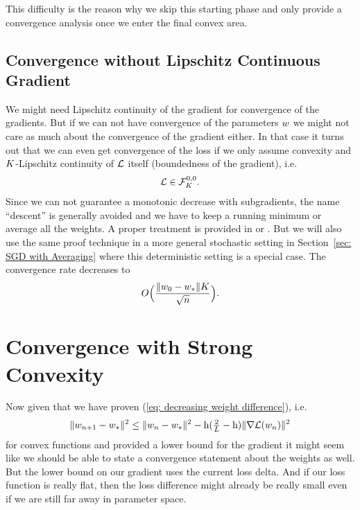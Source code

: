 This difficulty is the reason why we skip this starting phase and only
provide a convergence analysis once we enter the final convex area.

\subsection{Convergence without Lipschitz Continuous Gradient}\label{subsec: subgradient method}

We might need Lipschitz continuity of the gradient for convergence of the
gradients. But if we can not have convergence of the parameters \(\weights\) we
might not care as much about the convergence of the gradient either. In that
case it turns out that we can even get convergence of the loss if we only assume
convexity and \(\lipConst\)-Lipschitz continuity of \(\Loss\) itself
(boundedness of the gradient), i.e.
\begin{align*}
	\Loss \in \lipGradientSet[0,0]{\lipConst}.
\end{align*}
%
Since we can not guarantee a monotonic decrease with subgradients, the name
``descent'' is generally avoided and we have to keep a running minimum or
average all the weights. A proper treatment is provided in \textcite[Section
2.2.3]{nesterovLecturesConvexOptimization2018} or \textcite[Section
2.1]{bubeckConvexOptimizationAlgorithms2015}. But we will also use the same proof
technique in a more general stochastic setting in Section~\ref{sec: SGD with
Averaging} where this deterministic setting is a special case. The convergence
rate decreases to
\begin{align*}
	O\Big(\frac{\|\weights_0-\weights_*\|\lipConst}{\sqrt{n}}\Big).
\end{align*}

\section{Convergence with Strong Convexity}\label{sec: Strong Convexity}

Now given that we have proven (\ref{eq: decreasing weight difference}), i.e.
\begin{align}\label{eq: weight iteration}
	\|\weights_{n+1}-\minimum\|^2
	\le \|\weights_n - \minimum\|^2 - \lr(\tfrac2{\ubound} -\lr)\|\nabla\Loss(\weights_n)\|^2
\end{align}
for convex functions and provided a lower bound for the gradient it might seem
like we should be able to state a convergence statement about the weights as
well. But the lower bound on our gradient uses the current loss delta. And if
our loss function is really flat, then the loss difference might already be
really small even if we are still far away in parameter space.


